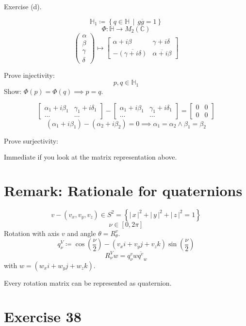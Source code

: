 \documentclass[a4paper]{article}
\theoremstyle{definition}
\newcommand\set[1]{\left\{#1\right\}}
\newcommand\setdef[2]{\left\{#1\,\middle|\,#2\right\}}
\newcommand\card[1]{\left|\,#1\,\right|}
\begin{document}
Exercise (d).

\[ \mathbb H_1 \coloneqq \setdef{q \in \mathbb H}{g \overline g = 1} \]
\[ \Phi: \mathbb H \to M_2(\mathbb C) \]
\[
  \begin{pmatrix} \alpha \\ \beta \\ \gamma \\ \delta \end{pmatrix}
  \mapsto \begin{bmatrix}
    \alpha + i \beta & \gamma + i\delta \\
    -\overline{(\gamma + i\delta)} & \overline{\alpha + i\beta}
  \end{bmatrix}
\]

Prove injectivity:
\[ p,q \in \mathbb H_1 \]
Show: $\Phi(p) = \Phi(q) \implies p = q$.

\[
  \begin{bmatrix}
    \alpha_1 + i\beta_1 & \gamma_1 + i\delta_1 \\
    \dots & \dots
  \end{bmatrix} - \begin{bmatrix}
    \alpha_1 + i\beta_1 & \gamma_1 + i\delta_1 \\
    \dots & \dots
  \end{bmatrix}
  = \begin{bmatrix} 0 & 0 \\ 0 & 0 \end{bmatrix}
\] \[
  (\alpha_1 + i \beta_1) - (\alpha_2 + i\beta_2) = 0 \implies \alpha_1 = \alpha_2 \land \beta_1 = \beta_2
\]

Prove surjectivity:

Immediate if you look at the matrix representation above.

\section{Remark: Rationale for quaternions}

\[ v - (v_x, v_y, v_z) \in S^2 = \set{\card{x}^2 + \card{y}^2 + \card{z}^2 = 1} \]
\[ \nu \in [0,2\pi] \]
Rotation with axis $v$ and angle $\theta = R_{\theta}^v$.
\[ q_{\nu}^V \coloneqq \cos(\frac\nu 2) - (v_x i + v_y j + v_z k) \sin(\frac\nu{2}) \]
\[ R_{\nu}^V w = q_\nu^v w \overline{q^v}_w \]
with $w = (w_x i + w_y j + w_z k)$.

Every rotation matrix can be represented as quaternion.

\section{Exercise 38}
\end{document}
